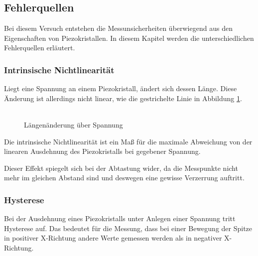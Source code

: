 \subsection{Fehlerquellen}
\label{kap2}

\noindent Bei diesem Versuch entstehen die Messunsicherheiten überwiegend aus den Eigenschaften von Piezokristallen. In diesem Kapitel werden die unterschiedlichen Fehlerquellen erläutert.

\subsubsection{Intrinsische Nichtlinearität}
Liegt eine Spannung an einem Piezokristall, ändert sich dessen Länge. Diese Änderung ist allerdings nicht linear, wie die gestrichelte Linie in Abbildung \ref{fig:nichtlinearität}.  

\begin{figure}
	\centering
		\includegraphics[width=0.5,scale=0.75\textwidth]{nichtlinearitat.png}
	\caption{Längenänderung über Spannung}
	\label{fig:nichtlinearität}
\end{figure}

\noindent Die intrinsische Nichtlinearität ist ein Maß für die maximale Abweichung von der linearen Ausdehnung des Piezokristalls bei gegebener Spannung. 

\noindent Dieser Effekt spiegelt sich bei der Abtastung wider, da die Messpunkte nicht mehr im gleichen Abstand sind und deswegen eine gewisse Verzerrung auftritt.

\subsubsection{Hysterese}
Bei der Ausdehnung eines Piezokristalls unter Anlegen einer Spannung tritt Hysterese auf.
Das bedeutet für die Messung, dass bei einer Bewegung der Spitze in positiver X-Richtung andere Werte gemessen werden als in negativer X-Richtung.

